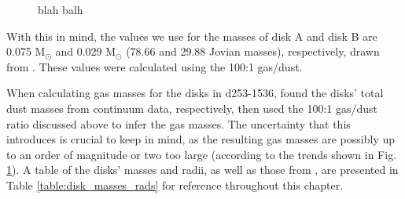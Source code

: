 
\begin{figure}[h]
  \hspace*{\fill}%
  \vfill%
  \hspace*{\fill}%
  \caption{blah balh}
  \label{fig:GDRs}
\end{figure}


With this in mind, the values we use for the masses of disk A and disk B are 0.075 M$_\odot$ and 0.029 M$_\odot$ (78.66 and 29.88 Jovian masses), respectively, drawn from \citet{Williams2014}. These values were calculated using the 100:1 gas/dust.


When calculating gas masses for the disks in d253-1536, \cite{Williams2014} found the disks' total dust masses from continuum data, respectively, then used the 100:1 gas/dust ratio discussed above to infer the gas masses. The uncertainty that this introduces is crucial to keep in mind, as the resulting gas masses are possibly up to an order of magnitude or two too large (according to the trends shown in Fig. \ref{fig:GDRs}). A table of the disks' masses and radii, as well as those from \citet{Factor2017}, are presented in Table \ref{table:disk_masses_rads} for reference throughout this chapter.


